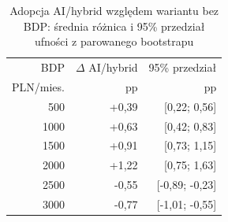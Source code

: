 \begin{table}[H]
\centering
\scriptsize
\caption{Adopcja AI/hybrid względem wariantu bez BDP: średnia różnica i 95\% przedział ufności z parowanego bootstrapu}
\label{tab:adoption-delta-ci}
\begin{tabular}{@{}rrr@{}}
\toprule
BDP & \(\Delta\) AI/hybrid & 95\% przedział \\
PLN/mies. & pp & pp \\
\midrule
500  & +0,39 & [0,22; 0,56] \\
1000 & +0,63 & [0,42; 0,83] \\
1500 & +0,91 & [0,73; 1,15] \\
2000 & +1,22 & [0,75; 1,63] \\
2500 & -0,55 & [-0,89; -0,23] \\
3000 & -0,77 & [-1,01; -0,55] \\
\bottomrule
\end{tabular}
\end{table}
